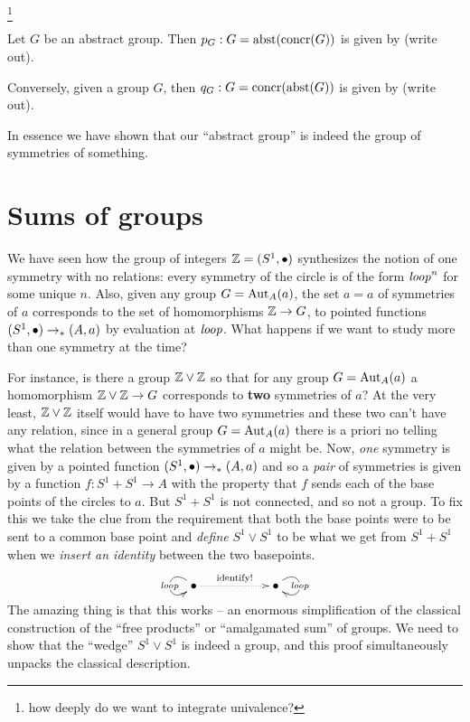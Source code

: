 \footnote{how deeply do we want to integrate univalence?}
\begin{lemma}
  \label{lem:Groupsareidentitytypes}Let $G$ be an abstract group.  Then $p_G:G=\mathrm{abst}(\mathrm{concr}(G))$ is given by (write out).

Conversely, given a group $G$, then $q_G:G=\mathrm{concr}(\mathrm{abst}(G))$  is given by (write out).
\end{lemma}
In essence we have shown that our ``abstract group'' is indeed the group of symmetries of something.
\section{Sums of groups}
\label{sec:coprod}
We have seen how the group of integers $\mathbb{Z}=(S^1,\bullet)$ synthesizes the notion of one symmetry with no relations: every symmetry of the circle is of the form $\mathit{loop}^n$ for some unique $n$.  Also, given any group $G=\mathrm{Aut}_A(a)$, the set $a=a$ of symmetries of $a$ corresponds to the set of homomorphisms $\mathbb{Z}\to G$, \ie to pointed functions $(S^1,\bullet)\to_*(A,a)$ by evaluation at $\mathit{loop}$.  What happens if we want to study more than one symmetry at the time?  

For instance, is there a group $\ZZ\vee%
\ZZ$ so that for any group $G=\mathrm{Aut}_A(a)$ a homomorphism $\ZZ\vee%
\ZZ\to G$ corresponds to {\bf two} symmetries of $a$?  
At the very least, $\mathbb{Z}\vee\mathbb{Z}$ itself would have to have two symmetries and these two can't have any relation, since in a general group $G=\mathrm{Aut}_A(a)$ there is a priori no telling what the relation between the symmetries of $a$ might be.  
Now, \emph{one} symmetry is given by a pointed function $(S^1,\bullet)\to_*(A,a)$ and so a \emph{pair} of symmetries is given by a function $f:S^1+S^1\to A$ with the property that $f$ sends each of the base points of the circles to $a$.  But $S^1+S^1$ is not connected, and so not a group.  To fix this we take the clue from the requirement that both the base points were to be sent to a common base point and \emph{define} $S^1\vee S^1$ to be what we get from $S^1+S^1$ when we \emph{insert an identity} between the two basepoints.
$$\xymatrix{\base\ar@(ul,dl)[]|{\Sloop}\ar@{.>}[rr]^{\text{identify!}}&&\base\ar@(ur,dr)[]|{\Sloop}}
$$
The amazing thing is that this works -- an enormous simplification of the classical construction of the ``free products'' or ``amalgamated sum'' of groups.  We need to show that the ``wedge'' $S^1\vee S^1$ is indeed a group, and this proof simultaneously unpacks the classical description.

